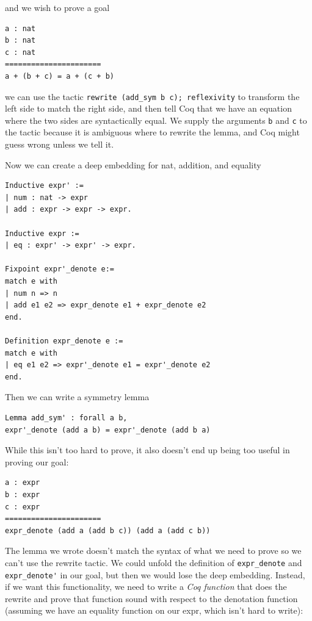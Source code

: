 \documentclass{puthesis}
\begin{document}
and we wish to prove a goal 

\begin{verbatim}
a : nat
b : nat
c : nat
======================
a + (b + c) = a + (c + b) 
\end{verbatim}

we can use the tactic \lstinline|rewrite (add_sym b c); reflexivity|
to transform the left side to match the right side, and then tell Coq
that we have an equation where the two sides are syntactically
equal. We supply the arguments \lstinline|b| and \lstinline|c| to the
tactic because it is ambiguous where to rewrite the lemma, and Coq
might guess wrong unless we tell it.

Now we can create a deep embedding for nat, addition, and equality

\begin{verbatim}
Inductive expr' :=
| num : nat -> expr
| add : expr -> expr -> expr.

Inductive expr :=
| eq : expr' -> expr' -> expr.

Fixpoint expr'_denote e:=
match e with
| num n => n
| add e1 e2 => expr_denote e1 + expr_denote e2
end.

Definition expr_denote e :=
match e with
| eq e1 e2 => expr'_denote e1 = expr'_denote e2
end.
\end{verbatim} 

Then we can write a symmetry lemma

\begin{verbatim}
Lemma add_sym' : forall a b, 
expr'_denote (add a b) = expr'_denote (add b a)
\end{verbatim}

While this isn't too hard to prove, it also doesn't end up being too
useful in proving our goal:

\begin{verbatim}
a : expr
b : expr
c : expr
======================
expr_denote (add a (add b c)) (add a (add c b))  
\end{verbatim}

The lemma we wrote doesn't match the syntax of what we need to prove
so we can't use the rewrite tactic. We could unfold the definition of
\lstinline|expr_denote| and \lstinline|expr_denote'| in our goal, but
then we would lose the deep embedding. Instead, if we want this
functionality, we need to write a \emph{Coq function} that does the
rewrite and prove that function sound with respect to the denotation
function (assuming we have an equality function on our expr, which
isn't hard to write):
\end{document}
